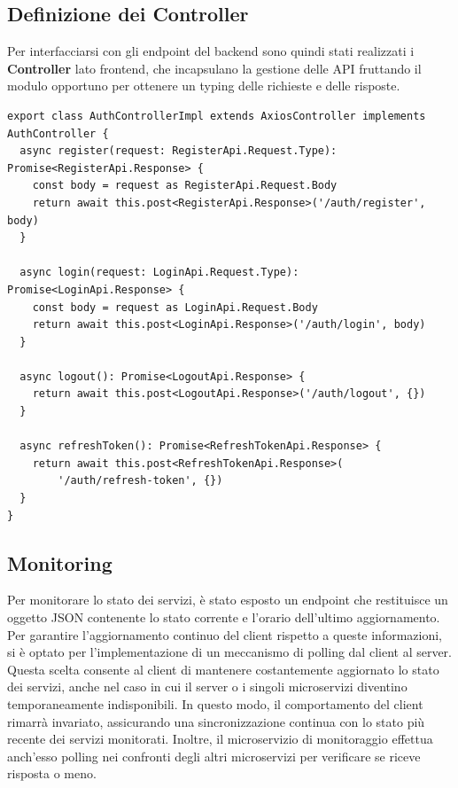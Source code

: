 %
%
%
\subsection{Definizione dei Controller}

Per interfacciarsi con gli endpoint del backend sono quindi stati realizzati i \textbf{Controller} lato frontend, che incapsulano la gestione delle API fruttando il modulo opportuno per ottenere un typing delle richieste e delle risposte.

\begin{lstlisting}[style=typescript, caption={Definizione Controller}, label=lst:controller]
export class AuthControllerImpl extends AxiosController implements AuthController {
  async register(request: RegisterApi.Request.Type): Promise<RegisterApi.Response> {
    const body = request as RegisterApi.Request.Body
    return await this.post<RegisterApi.Response>('/auth/register', body)
  }

  async login(request: LoginApi.Request.Type): Promise<LoginApi.Response> {
    const body = request as LoginApi.Request.Body
    return await this.post<LoginApi.Response>('/auth/login', body)
  }

  async logout(): Promise<LogoutApi.Response> {
    return await this.post<LogoutApi.Response>('/auth/logout', {})
  }

  async refreshToken(): Promise<RefreshTokenApi.Response> {
    return await this.post<RefreshTokenApi.Response>(
        '/auth/refresh-token', {})
  }
}
\end{lstlisting}

%
%
%
\subsection{Monitoring}

Per monitorare lo stato dei servizi, è stato esposto un endpoint che restituisce un oggetto JSON contenente lo stato corrente e l'orario dell'ultimo aggiornamento.
%
Per garantire l'aggiornamento continuo del client rispetto a queste informazioni, si è optato per l'implementazione di un meccanismo di polling dal client al server.
%
Questa scelta consente al client di mantenere costantemente aggiornato lo stato dei servizi, anche nel caso in cui il server o i singoli microservizi diventino temporaneamente indisponibili.
%
In questo modo, il comportamento del client rimarrà invariato, assicurando una sincronizzazione continua con lo stato più recente dei servizi monitorati.
%
Inoltre, il microservizio di monitoraggio effettua anch'esso polling nei confronti degli altri microservizi per verificare se riceve risposta o meno.

